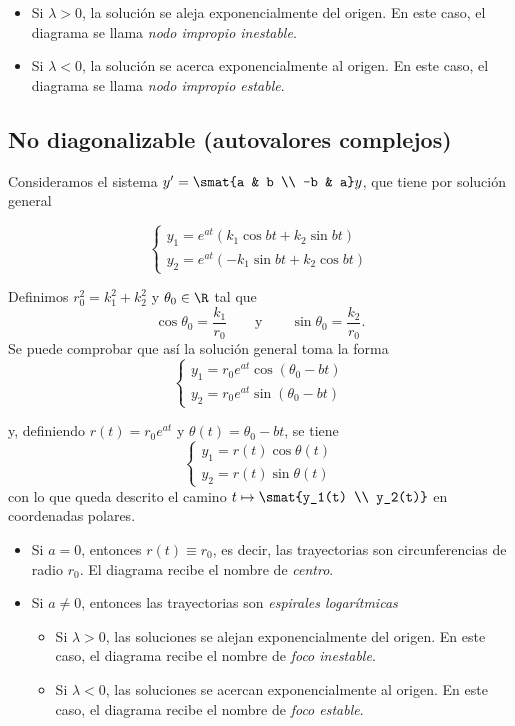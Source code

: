 \documentclass[../ecuaciones_diferenciales.tex]{subfiles}
\begin{document}
\begin{itemize}
	\item Si \(\lambda > 0\), la solución se aleja exponencialmente del origen. En
	      este caso, el diagrama se llama \emph{nodo impropio inestable}.
	\item Si \(\lambda < 0\), la solución se acerca exponencialmente al origen. En
	      este caso, el diagrama se llama \emph{nodo impropio estable}.
\end{itemize}

\subsection{No diagonalizable (autovalores complejos)}
Consideramos el sistema \(y' = \smat{a & b \\ -b & a}y\), que tiene por solución
general

\[
	\begin{cases}
		y_1 = e^{at}(k_1 \cos bt + k_2 \sin bt) \\
		y_2 = e^{at}(-k_1 \sin bt + k_2 \cos bt)
	\end{cases}
\]

Definimos \(r_0^2 = k_1^2+k_2^2\) y \(\theta_0 \in \R\) tal que
\[\cos \theta_0 = \frac{k_1}{r_0} \qquad \text{y} \qquad \sin \theta_0 = \frac{k_2}{r_0}.\]
Se puede comprobar que así la solución general toma la forma
\[
	\begin{cases}
		y_1 = r_0e^{at} \cos (\theta_0 - bt) \\
		y_2 = r_0e^{at} \sin (\theta_0 - bt)
	\end{cases}
\]

y, definiendo \(r(t) = r_0e^{at}\) y \(\theta(t) = \theta_0 - bt\), se tiene
\[
	\begin{cases}
		y_1 = r(t) \cos \theta(t) \\
		y_2 = r(t) \sin \theta(t)
	\end{cases}
\]
con lo que queda descrito el camino \(t \mapsto \smat{y_1(t) \\ y_2(t)}\) en
coordenadas polares.

\begin{itemize}
	\item Si \(a = 0\), entonces \(r(t) \equiv r_0\), es decir, las trayectorias son
	      circunferencias de radio \(r_0\). El diagrama recibe el nombre de \emph{centro}.
	\item Si \(a \neq 0\), entonces las trayectorias son \emph{espirales logarítmicas}
	      \begin{itemize}
		      \item Si \(\lambda > 0\), las soluciones se alejan exponencialmente del
		            origen. En este caso, el diagrama recibe el nombre de \emph{foco inestable}.
		      \item Si \(\lambda < 0\), las soluciones se acercan exponencialmente al
		            origen. En este caso, el diagrama recibe el nombre de \emph{foco estable}.
	      \end{itemize}
\end{itemize}
\end{document}

